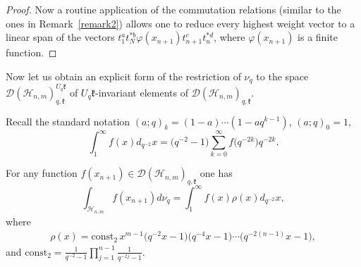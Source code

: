 \begin{proof}
Now a routine application of the commutation relations (similar to the ones in Remark~\ref{remark2}) allows one to reduce
every highest weight vector to a linear span of the vectors $t_1^at_N^{*b}\varphi(x_{n+1})t_{n+1}^ct_n^{*d}$,
where $\varphi(x_{n+1})$ is a f\/inite function.
\end{proof}



Now let us obtain an explicit form of the restriction of $\nu_q$ to the space
$\mathscr{D}(\mathscr{H}_{n,m})_{q,\mathfrak{k}}^{U_q \mathfrak{k}}$ of $U_q \mathfrak{k}$-invariant elements
of $\mathscr{D}(\mathscr{H}_{n,m})_{q,\mathfrak{k}}$.

Recall the standard notation $(a;q)_k=(1-a)\cdots (1-aq^{k-1})$, $(a;q)_0=1$,
\[
\int_{1}^\infty f(x) d_{q^{-2}}x=\big(q^{-2}-1\big)\sum_{k=0}^\infty f\big(q^{-2k}\big)q^{-2k}.
\]

\begin{proposition}\label{rad_int}
For any function $f(x_{n+1}) \in \mathscr{D}(\mathscr{H}_{n,m})_{q,\mathfrak{k}}$ one has
\[
\int_{\mathscr{H}_{n,m}} f(x_{n+1}) d\nu_q= \int_1^\infty f(x)\rho(x) d_{q^{-2}}x,
\]
where
\begin{gather}\label{rho_x}
\rho(x)=\mathrm{const_2}\,   x^{m-1}\big(q^{-2}x-1\big)\big(q^{-4}x-1\big)\cdots \big(q^{-2(n-1)}x-1\big),
\end{gather}
and $\mathrm{const_2}=\frac{1}{q^{-2}-1}\prod \limits_{j=1}^{n-1}\frac{1}{q^{-2j}-1}.$
\end{proposition}

